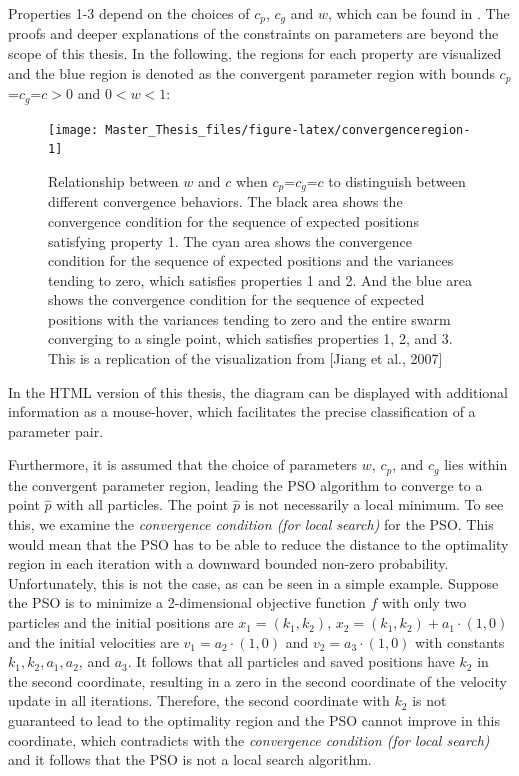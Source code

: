 \documentclass[
  oneside, a4paper, 12pt, openany]{book}
\theoremstyle{definition}
\theoremstyle{definition}
\theoremstyle{definition}
\theoremstyle{definition}
\theoremstyle{remark}
\begin{document}
Properties 1-3 depend on the choices of \(c_p\), \(c_g\) and \(w\), which can be found in \citep{Mjly2006}. The proofs and deeper explanations of the constraints on parameters are beyond the scope of this thesis. In the following, the regions for each property are visualized and the blue region is denoted as the convergent parameter region with bounds \(c_p\)=\(c_g\)=\(c>0\) and \(0<w<1\):

\begin{figure}[H]
\texttt{[image: Master\_Thesis\_files/figure-latex/convergenceregion-1]} \caption{Relationship between $w$ and $c$ when $c_p$=$c_g$=$c$ to distinguish between different convergence behaviors. The black area shows the convergence condition for the sequence of expected positions satisfying property 1. The cyan area shows the convergence condition for the sequence of expected positions and the variances tending to zero, which satisfies properties 1 and 2. And the blue area shows the convergence condition for the sequence of expected positions with the variances tending to zero and the entire swarm converging to a single point, which satisfies properties 1, 2, and 3. This is a replication of the visualization from [Jiang et al., 2007]}\label{fig:convergenceregion}
\end{figure}

In the HTML version of this thesis, the diagram can be displayed with additional information as a mouse-hover, which facilitates the precise classification of a parameter pair.

Furthermore, it is assumed that the choice of parameters \(w\), \(c_p\), and \(c_g\) lies within the convergent parameter region, leading the PSO algorithm to converge to a point \(\hat{p}\) with all particles. The point \(\hat{p}\) is not necessarily a local minimum. To see this, we examine the \emph{convergence condition (for local search)} for the PSO. This would mean that the PSO has to be able to reduce the distance to the optimality region in each iteration with a downward bounded non-zero probability. Unfortunately, this is not the case, as can be seen in a simple example. Suppose the PSO is to minimize a 2-dimensional objective function \(f\) with only two particles and the initial positions are \(x_1=(k_1, k_2)\), \(x_2=(k_1, k_2) + a_1 \cdot (1, 0)\) and the initial velocities are \(v_1=a_2 \cdot (1, 0)\) and \(v_2=a_3 \cdot (1, 0)\) with constants \(k_1, k_2, a_1, a_2\), and \(a_3\). It follows that all particles and saved positions have \(k_2\) in the second coordinate, resulting in a zero in the second coordinate of the velocity update in all iterations. Therefore, the second coordinate with \(k_2\) is not guaranteed to lead to the optimality region and the PSO cannot improve in this coordinate, which contradicts with the \emph{convergence condition (for local search)} and it follows that the PSO is not a local search algorithm.
\end{document}
